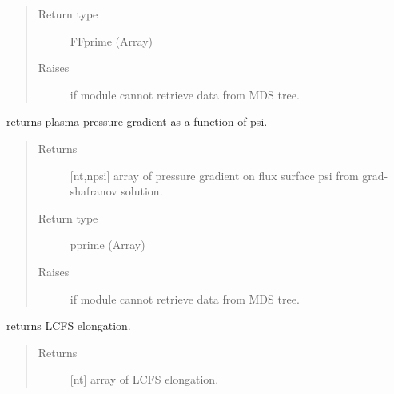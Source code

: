 \documentclass[letterpaper,10pt,english]{sphinxmanual}
\begin{document}
\begin{fulllineitems}
\begin{fulllineitems}
\begin{quote}
\begin{description}
\item[{Return type}] \leavevmode
FFprime (Array)

\item[{Raises}] \leavevmode
{} \textendash{} if module cannot retrieve data from MDS tree.

\end{description}\end{quote}

\end{fulllineitems}


\begin{fulllineitems}
\label{\detokenize{eqtools:eqtools.TCVLIUQE.TCVLIUQETree.getPPrime}}
returns plasma pressure gradient as a function of psi.
\begin{quote}\begin{description}
\item[{Returns}] \leavevmode
{[}nt,npsi{]} array of pressure gradient on flux surface
psi from grad-shafranov solution.

\item[{Return type}] \leavevmode
pprime (Array)

\item[{Raises}] \leavevmode
{} \textendash{} if module cannot retrieve data from MDS tree.

\end{description}\end{quote}

\end{fulllineitems}


\begin{fulllineitems}
\label{\detokenize{eqtools:eqtools.TCVLIUQE.TCVLIUQETree.getElongation}}
returns LCFS elongation.
\begin{quote}\begin{description}
\item[{Returns}] \leavevmode
{[}nt{]} array of LCFS elongation.


\end{description}
\end{quote}
\end{fulllineitems}
\end{fulllineitems}
\end{document}
